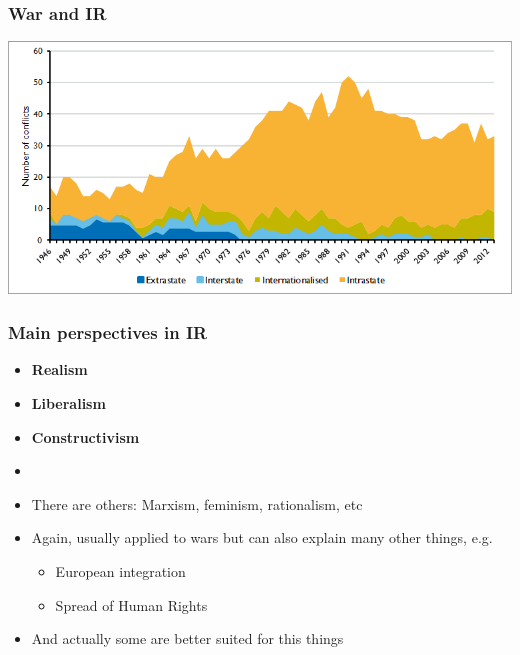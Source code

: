 \documentclass[aspectratio=43]{beamer}
\begin{document}
\begin{frame}
\frametitle{War and IR}
\centering

\includegraphics[width = \textwidth]{img/armed_conflicts}

\end{frame}

\begin{frame}
\frametitle{Main perspectives in IR}
\centering

\begin{itemize}
  \item<1-> \textbf{Realism}
  \item<1-> \textbf{Liberalism}
  \item<1-> \textbf{Constructivism}
  \item[]
  \item<2-> There are others: Marxism, feminism, rationalism, etc
  \item<3-> Again, usually applied to wars but can also explain many other things, e.g.
  \begin{itemize}
    \item European integration
    \item Spread of Human Rights
  \end{itemize}
  \item<3-> And actually some are better suited for this things
\end{itemize}

\end{frame}
\end{document}
